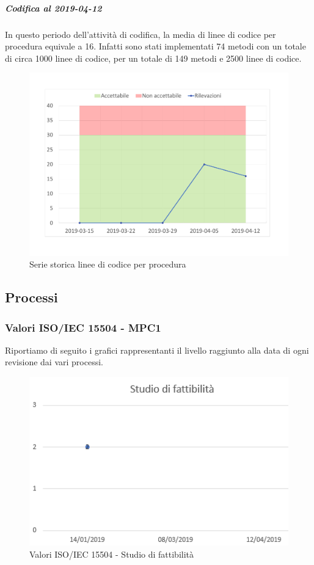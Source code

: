 \subparagraph{Codifica al 2019-04-12}
In questo periodo dell'attività di codifica, la media di linee di codice per procedura equivale a 16. Infatti sono stati implementati 74 metodi con un totale di circa 1000 linee di codice, per un totale di 149 metodi e 2500 linee di codice.
\begin{figure}[H]
	\centering
	\includegraphics[scale=0.6]{images/resoconto/MPS10Chart.pdf}
	\caption{Serie storica linee di codice per procedura}	
\end{figure}

\subsection{Processi}
\subsubsection{Valori ISO/IEC 15504 - MPC1}

Riportiamo di seguito i grafici rappresentanti il livello raggiunto alla data di ogni revisione dai vari processi.


\begin{figure}[H]
	\centering
	\includegraphics[scale=1]{images/resoconto/Studio.png}
	\caption{Valori ISO/IEC 15504 - Studio di fattibilità}	
\end{figure}


